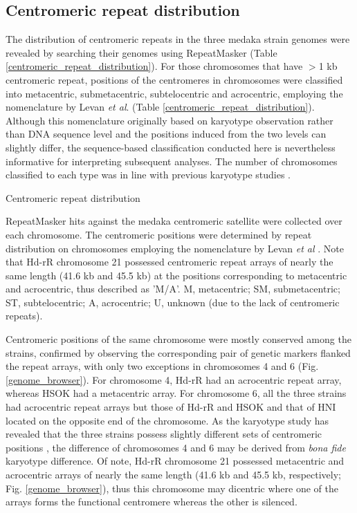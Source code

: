 

\subsection*{Centromeric repeat distribution}
  The distribution of centromeric repeats in the three medaka strain genomes were revealed by searching their genomes using RepeatMasker (Table \ref{centromeric_repeat_distribution}). For those chromosomes that have $>$1 kb centromeric repeat, positions of the centromeres in chromosomes were classified into metacentric, submetacentric, subtelocentric and acrocentric, employing the nomenclature by Levan \textit{et al}. \cite{levan1964} (Table \ref{centromeric_repeat_distribution}). Although this nomenclature originally based on karyotype observation rather than DNA sequence level and the positions induced from the two levels can slightly differ, the sequence-based classification conducted here is  nevertheless informative for interpreting subsequent analyses. The number of chromosomes classified to each type was in line with previous karyotype studies \cite{}.


  \begin{table*}[htp]
    \centering
    \caption{Centromeric repeat distribution}
    
    \label{centromeric_repeat_distribution}
    \caption*{{\small
      RepeatMasker hits against the medaka centromeric satellite were collected over each chromosome. The centromeric positions were determined by repeat distribution on chromosomes employing the nomenclature by Levan \textit{et al} \cite{Levan1964}. Note that Hd-rR chromosome 21 possessed centromeric repeat arrays of nearly the same length (41.6 kb and 45.5 kb) at the positions corresponding to metacentric and acrocentric, thus described as 'M/A'. M, metacentric; SM, submetacentric; ST, subtelocentric; A, acrocentric; U, unknown (due to the lack of centromeric repeats).
    }}
  \end{table*}

  Centromeric positions of the same chromosome were mostly conserved among the strains, confirmed by observing the corresponding pair of genetic markers flanked the repeat arrays, with only two exceptions in chromosomes 4 and 6 (Fig. \ref{genome_browser}). For chromosome 4, Hd-rR had an acrocentric repeat array, whereas HSOK had a metacentric array. For chromosome 6, all the three strains had acrocentric repeat arrays but those of Hd-rR and HSOK and that of HNI located on the opposite end of the chromosome. As the karyotype study has revealed that the three strains possess slightly different sets of centromeric positions \cite{}, the difference of chromosomes 4 and 6 may be derived from \textit{bona fide} karyotype difference. Of note, Hd-rR chromosome 21 possessed metacentric and acrocentric arrays of nearly the same length (41.6 kb and 45.5 kb, respectively; Fig. \ref{genome_browser}), thus this chromosome may dicentric where one of the arrays forms the functional centromere whereas the other is silenced.

